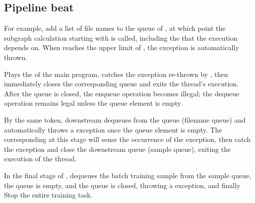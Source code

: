 \begin{content}
\subsection{Pipeline beat}
For example, add a list of file names to the queue of , at which point the subgraph calculation starting with  is called, including the  that the execution depends on. When  reaches the upper limit of , the  exception is automatically thrown.

Plays the  of the main program, catches the  exception re-thrown by , then immediately closes the corresponding queue and exits the thread's execution. After the queue is closed, the enqueue operation becomes illegal; the dequeue operation remains legal unless the queue element is empty.

By the same token, downstream  dequeues from the queue (filename queue) and automatically throws a  exception once the queue element is empty. The corresponding  at this stage will sense the occurrence of the exception, then catch the exception and close the downstream queue (sample queue), exiting the execution of the thread.

In the final stage of ,  dequeues the batch training sample from the sample queue, the queue is empty, and the queue is closed, throwing a  exception, and finally Stop the entire training task.

\end{content}
